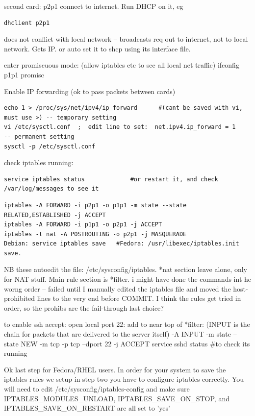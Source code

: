 \documentclass[oneside,english]{scrbook}
\begin{document}
second card: p2p1 connect to internet.   Run DHCP on it, eg
\begin{lstlisting}
dhclient p2p1
\end{lstlisting}
does not conflict with local network -- broadcasts req out to internet, not to local network. Gets IP.
or auto set it to shcp using its interface file.

enter promiscuous mode: (allow iptables etc to see all local net traffic)
ifconfig p1p1 promisc

Enable IP forwarding (ok to pass packets between cards)
\begin{lstlisting}
echo 1 > /proc/sys/net/ipv4/ip_forward      #(cant be saved with vi, must use >) -- temporary setting
vi /etc/sysctl.conf  ;  edit line to set:  net.ipv4.ip_forward = 1    -- permanent setting
sysctl -p /etc/sysctl.conf
\end{lstlisting}

check iptables running:
\begin{lstlisting}
service iptables status             #or restart it, and check /var/log/messages to see it
\end{lstlisting}

\begin{lstlisting}
iptables -A FORWARD -i p2p1 -o p1p1 -m state --state RELATED,ESTABLISHED -j ACCEPT
iptables -A FORWARD -i p1p1 -o p2p1 -j ACCEPT
iptables -t nat -A POSTROUTING -o p2p1 -j MASQUERADE
Debian: service iptables save   #Fedora: /usr/libexec/iptables.init save.
\end{lstlisting}

NB these autoedit the file:  /etc/sysconfig/iptables.   *nat section leave alone, only for NAT stuff.   Main rule section is *filter.
    i might have done the commands int he worng order -- failed until I manually edited the iptables file and moved the host-prohibited lines to the very end before COMMIT.  I think the rules get tried in order, so the prohibs are the fail-through last choice?

to enable ssh accept: open local port 22: add to near top of *filter:   (INPUT is the chain for packets that are delivered to the server itself)
  -A INPUT -m state --state NEW -m tcp -p tcp --dport 22 -j ACCEPT
    service sshd status  #to check its running

Ok last step for Fedora/RHEL users. In order for your system to save the iptables rules we setup in step two you have to configure iptables correctly. You will need to edit /etc/sysconfig/iptables-config and make sure IPTABLES_MODULES_UNLOAD, IPTABLES_SAVE_ON_STOP, and IPTABLES_SAVE_ON_RESTART are all set to 'yes'
\end{document}

